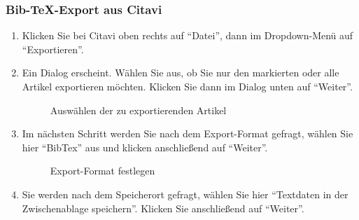 \subsubsection*{Bib-TeX-Export aus Citavi}\label{sss:importCitavi} 
\begin{enumerate}
    \item Klicken Sie bei Citavi oben rechts auf \enquote{Datei}, dann im Dropdown-Menü auf \enquote{Exportieren}.
    \item Ein Dialog erscheint. Wählen Sie aus, ob Sie nur den markierten oder alle Artikel exportieren möchten. Klicken Sie dann im Dialog unten auf \enquote{Weiter}.

\begin{figure}[h!]
 \centering
 \caption{Auswählen der zu exportierenden Artikel}
 \label{fig:exportierendenArtikelAuswaehlen}
\end{figure}
    \item Im nächsten Schritt werden Sie nach dem Export-Format gefragt, wählen Sie hier \enquote{BibTex} aus und klicken anschließend auf \enquote{Weiter}.
  
\begin{figure}[h!]
 \centering
 \caption{Export-Format festlegen}
 \label{fig:exportFormatFestlegen}
\end{figure}
    \item Sie werden nach dem Speicherort gefragt, wählen Sie hier \enquote{Textdaten in der Zwischenablage speichern}. Klicken Sie anschließend auf \enquote{Weiter}.
   

\end{enumerate}
